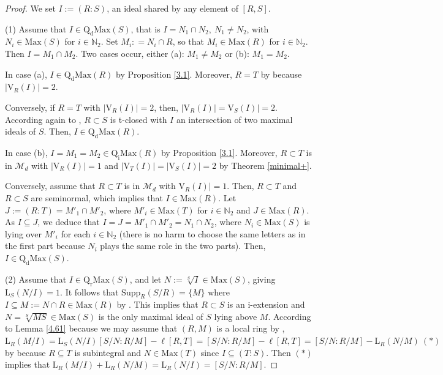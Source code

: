 \documentclass[12pt,leqno]{amsart}
\theoremstyle{definition}
\begin{document}
\begin{proof} We set $I:=(R:S)$, an ideal shared by any element of $[R,S]$.

(1) Assume that $I\in\mathrm{Q_dMax}(S)$, that is $I=N_1\cap N_2,\ N_1 \neq N_2$, with $N_i\in\mathrm{Max}(S)$ for $i\in\mathbb N_2$. Set $M_i: =N_i\cap R$, so that $M_i\in\mathrm{Max}(R)$ for $i\in\mathbb N_2$. Then $I=M_1\cap M_2$. Two cases occur, either (a): $M_1\neq M_2$ or (b): $M_1=M_2$.  

In case (a), $I\in\mathrm{Q_dMax}(R)$ by Proposition \ref{3.1}. Moreover, $R=T$ by \cite[Proposition 2.5]{SPLIT} because $|\mathrm{V}_R(I)|=2$. 

Conversely, if $R=T$ with $|\mathrm{V}_R(I)|=2$, then, $|\mathrm{V}_R(I)|=\mathrm{V}_S(I)|=2$. According again to \cite[Proposition 2.5]{SPLIT}, $R \subset S$ is t-closed with $I$ an intersection of two maximal ideals of $S$. Then, $I\in\mathrm{Q_dMax}(R)$. 

In case (b), $I=M_1=M_2\in\mathrm{Q_iMax}(R)$ by Proposition \ref{3.1}. Moreover, $R\subset T$ is in $\mathcal M_d$ with $|\mathrm{V}_R(I)|=1$ and $|\mathrm{V}_T(I)|=|\mathrm{V}_S(I)|=2$ by Theorem \ref{minimal+}. 

Conversely, assume that $R\subset T$ is in $\mathcal M_d$ with $\mathrm {V}_R(I)|=1$. Then, $R\subset T$ and $R\subset S$ are  seminormal, which implies that $I\in\mathrm{Max}(R)$. Let $J:=(R:T)=M'_1\cap M'_2$, where $M'_i\in\mathrm{Max}(T)$ for $i\in\mathbb N_2$ and $J\in\mathrm {Max}(R)$. As $I\subseteq J$, we deduce that $I=J=M'_1\cap M'_2=N_1 \cap N_2$, where $N_i\in\mathrm{Max}(S)$ is lying over $M'_i$ for each $i\in\mathbb N_2$ (there is no harm to choose the same letters as in the first part because $N_i$ plays the same role in the two  parts). Then, 
 $I\in\mathrm{Q_dMax}(S)$. 

(2) Assume that $I\in\mathrm{Q_rMax}(S)$, and let $N:=\sqrt[S]I\in\mathrm {Max}(S)$, giving $\mathrm{L}_{S}(N/I)=1$. It follows that $\mathrm{Supp}_R(S/R)=\{M\}$ where $I\subseteq M:=N\cap R\in\mathrm{Max}(R)$ by \cite[Proposition 5.7 and Example 5.15]{Pic 18}. This implies that $R\subset S$ is an i-extension and $N=\sqrt[S]{MS}\in\mathrm{Max}(S)$ is the only maximal ideal of $S$ lying above $M$. According to Lemma \ref{4.61} because we may assume that $(R,M)$ is a local ring by \cite[Theorem 12, p. 166]{N}, $\mathrm{L}_R(M/I)=\mathrm{L}_S(N/I)[S/N: R/M]-\ell[R,T]= [S/N:R/M]-\ell[R,T]=[S/N:R/M]-\mathrm{L}_R(N/M)\ (*)$ by \cite[Lemma 5.4]{DPP2} because $R\subseteq T$ is subintegral and $N\in\mathrm{Max}(T)$ since $I\subseteq(T:S)$. Then $(*)$ implies that $\mathrm{L}_R(M/I)+\mathrm{L}_R(N/M)=\mathrm{L}_R(N/I)=[S/N:R/M]$.


\end{proof}
\end{document}
